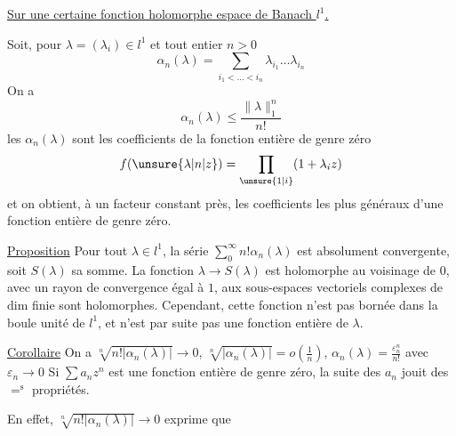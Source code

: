 \uline{Sur une certaine fonction holomorphe  espace de Banach $l^1$.}

Soit, pour $\lambda=(\lambda_i)\in l^1$ et tout entier $n>0$
\[ \alpha_n(\lambda)=\sum_{i_1<\ldots<i_n}\lambda_{i_1}\ldots\lambda_{i_n} \]
On a
\[ \alpha_n(\lambda)\leq\frac{\|\lambda\|_1^n}{n!} \]
les $\alpha_n(\lambda)$ sont les coefficients de la fonction entière
de genre zéro
\[ f(\unsure{\lambda|n|z})=\prod_{\unsure{1|i}}(1+\lambda_i z) \]
et on obtient, à un facteur constant près, les
coefficients les plus généraux d'une fonction entière
de genre zéro.

\uline{Proposition} Pour tout $\lambda\in l^1$, la série $\sum_0^\infty n!\alpha_n(\lambda)$
est absolument convergente, soit $S(\lambda)$ sa somme.
La fonction $\lambda\to S(\lambda)$ est holomorphe au voisinage
de $0$, avec un rayon de convergence égal à $1$,
  aux sous-espaces vectoriels
complexes de $\mathrm{dim}$ finie sont holomorphes.
Cependant,  cette fonction n'est pas bornée
dans la boule unité de $l^1$, et n'est par
suite pas une fonction entière de $\lambda$.

\uline{Corollaire} On a  $\sqrt[n]{n!|\alpha_n(\lambda)|}\to 0$,
$\sqrt[n]{|\alpha_n(\lambda)|}=o\left(\frac{1}{n}\right)$, $\alpha_n(\lambda)=\frac{\varepsilon_n^n}{n!}$ avec $\varepsilon_n\to 0$
Si $\sum a_nz^n$ est une fonction entière de
genre zéro, la suite des $a_n$ jouit
des $=^{\mathrm s}$ propriétés.

En effet, $\sqrt[n]{n!|\alpha_n(\lambda)|}\to 0$ exprime que
